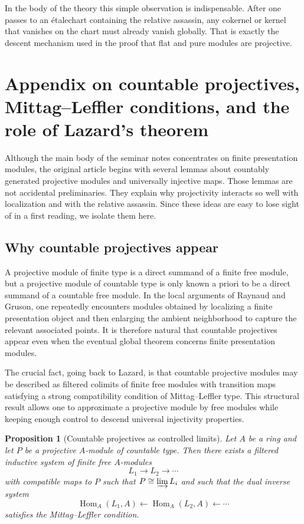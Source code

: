 \documentclass[11pt,oneside]{article}
\newtheorem{proposition}[theorem]{Proposition}
\newcommand{\Hom}{\operatorname{Hom}}
\newcommand{\etale}{\'etale}
\begin{document}
In the body of the theory this simple observation is indispensable.  After one passes to an \etale chart containing the relative assassin, any cokernel or kernel that vanishes on the chart must already vanish globally.  That is exactly the descent mechanism used in the proof that flat and pure modules are projective.


\section{Appendix on countable projectives, Mittag--Leffler conditions, and the role of Lazard's theorem}

Although the main body of the seminar notes concentrates on finite presentation modules, the original article begins with several lemmas about countably generated projective modules and universally injective maps.  Those lemmas are not accidental preliminaries.  They explain why projectivity interacts so well with localization and with the relative assassin.  Since these ideas are easy to lose sight of in a first reading, we isolate them here.

\subsection{Why countable projectives appear}

A projective module of finite type is a direct summand of a finite free module, but a projective module of countable type is only known a priori to be a direct summand of a countable free module.  In the local arguments of Raynaud and Gruson, one repeatedly encounters modules obtained by localizing a finite presentation object and then enlarging the ambient neighborhood to capture the relevant associated points.  It is therefore natural that countable projectives appear even when the eventual global theorem concerns finite presentation modules.

The crucial fact, going back to Lazard, is that countable projective modules may be described as filtered colimits of finite free modules with transition maps satisfying a strong compatibility condition of Mittag--Leffler type.  This structural result allows one to approximate a projective module by free modules while keeping enough control to descend universal injectivity properties.

\begin{proposition}[Countable projectives as controlled limits]\label{prop:countable-projectives-long}
Let $A$ be a ring and let $P$ be a projective $A$-module of countable type.  Then there exists a filtered inductive system of finite free $A$-modules
\[
L_1\to L_2\to \cdots
\]
with compatible maps to $P$ such that $P\cong \varinjlim L_i$ and such that the dual inverse system
\[
\Hom_A(L_1,A)\leftarrow \Hom_A(L_2,A)\leftarrow \cdots
\]
satisfies the Mittag--Leffler condition.
\end{proposition}
\end{document}
